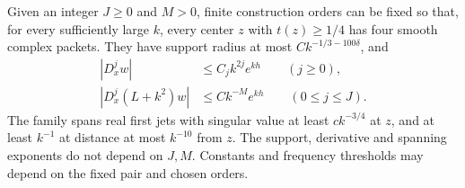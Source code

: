 \begin{proposition}\label{prop:packets}
Given an integer \(J\ge0\) and \(M>0\), finite construction orders
can be fixed so that, for every sufficiently large \(k\), every
center \(z\) with \(t(z)\ge1/4\) has four smooth complex packets.
They have support radius at most \(Ck^{-1/3-100\delta}\), and
\begin{align}
 |D_x^j w|&\le C_j k^{2j}e^{kh}\qquad(j\ge0),\label{eq:packetder}\\
 |D_x^j(L+k^2)w|&\le Ck^{-M}e^{kh}
                    \qquad(0\le j\le J).\label{eq:packetres}
\end{align}
The family spans real first jets with singular value at least
\(ck^{-3/4}\) at \(z\), and at least \(k^{-1}\) at distance
at most \(k^{-10}\) from \(z\). The support, derivative and
spanning exponents do not depend on \(J,M\). Constants and
frequency thresholds may depend on the fixed pair and chosen orders.
\end{proposition}

